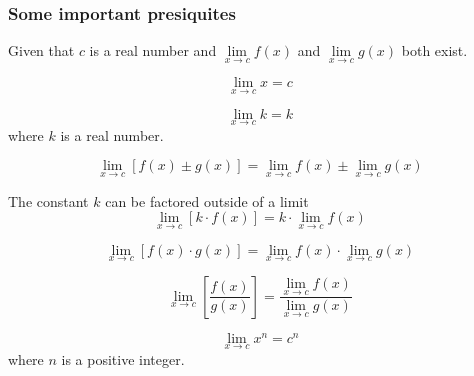 \documentclass[10pt,paper=letter]{scrartcl}
\begin{document}
\subsubsection*{Some important presiquites}

\begin{mdframed}[style=jremmdbox, frametitle = Some important presiquites]

Given that $c$ is a real number and $\displaystyle \mathop {\lim }\limits_{x \rightarrow c}f(x)$ and $\displaystyle \mathop {\lim }\limits_{x \rightarrow c} g(x)$ both exist.

\begin{theorem}
$$\displaystyle \mathop {\lim }\limits_{x \rightarrow c} {x} = c$$
\end{theorem}

\begin{theorem}
$$\displaystyle \mathop {\lim }\limits_{x \rightarrow c} {k} = k$$ where $k$ is a real number.
\end{theorem}

\begin{theorem}
$$\displaystyle \mathop {\lim }\limits_{x \rightarrow c} {[f(x) \pm g(x)]} = \displaystyle \mathop {\lim }\limits_{x \rightarrow c} f(x) \pm \displaystyle \mathop {\lim }\limits_{x \rightarrow c} g(x)$$ 
\end{theorem}

\begin{theorem} The constant $k$ can be factored outside of a
limit $$\displaystyle \mathop {\lim }\limits_{x \rightarrow c} {[k \cdot f(x)]} = k \cdot \displaystyle \mathop {\lim }\limits_{x \rightarrow c} f(x) $$ 
\end{theorem}

\begin{theorem} $$\displaystyle \mathop {\lim }\limits_{x \rightarrow c} {[f(x) \cdot g(x)]} = \displaystyle \mathop {\lim }\limits_{x \rightarrow c} f(x) \cdot \displaystyle \mathop {\lim }\limits_{x \rightarrow c} g(x)$$ 

\end{theorem}

\begin{theorem} $$\displaystyle \mathop {\lim }\limits_{x \rightarrow c} {\left[\dfrac{f(x)}{g(x)}\right]} = \dfrac{ \displaystyle \mathop {\lim }\limits_{x \rightarrow c} f(x)}  {\displaystyle \mathop {\lim }\limits_{x \rightarrow c} g(x)}$$ 

\end{theorem}

\begin{theorem} $$\displaystyle \mathop {\lim }\limits_{x \rightarrow c} {x^n} = c^n$$ where $n$ is a positive integer.

\end{theorem}
\end{mdframed}
\end{document}
